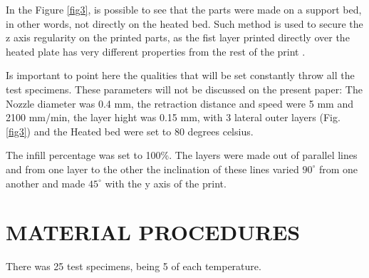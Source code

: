\documentclass[10pt,fleqn,a4paper,twoside]{article}
\begin{document}
In the Figure \ref{fig3}, is possible to see that the parts were made on a support bed, in other words, not directly on the heated bed. Such method is used to secure the z axis regularity on the printed parts, as the fist layer printed directly over the heated plate has very different properties from the rest of the print \citep{PETG}. 

Is important to point here the qualities that will be set constantly throw all the test specimens. These parameters will not be discussed on the present paper: The Nozzle diameter was 0.4 mm, the retraction distance and speed were 5 mm and 2100 mm/min, the layer hight was 0.15 mm, with 3 lateral outer layers (Fig.\ref{fig3}) and the Heated bed were set to 80 degrees celsius.

The infill percentage was set to 100\%. The layers were made out of parallel lines and from one layer to the other the inclination of these lines varied $90^\circ$ from one another and made $45^\circ$ with the y axis of the print.









%






\section{MATERIAL PROCEDURES}
There was 25 test specimens, being 5 of each temperature. 
\end{document}

